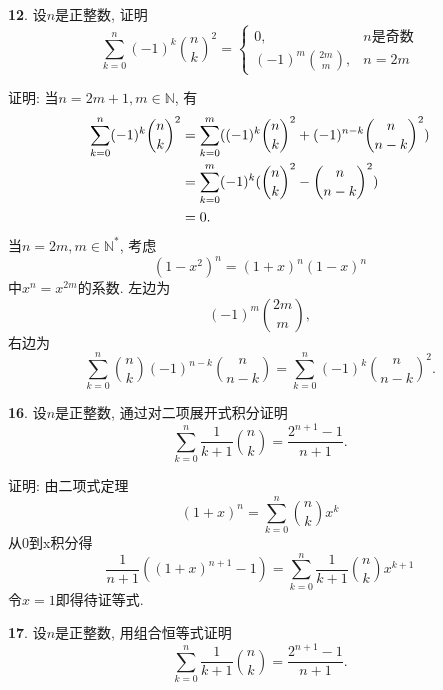 \documentclass[12pt,a4paper]{article}
\begin{document}
\begin{CJK*}{GBK}{song}
\par \textbf{12}. 设$n$是正整数, 证明
\begin{displaymath}
\sum^{n}_{k=0}(-1)^{k}\binom{n}{k}^2=
\begin{cases}
0,& n\text{是奇数}\\
(-1)^m\binom{2m}{m}, & n=2m
\end{cases}
\end{displaymath}
\par 证明: 当$n=2m+1,m\in\mathbb{N}$, 有
\begin{align*}
\sum^{n}_{k=0}(-1)^{k}\binom{n}{k}^2
&=\sum^{m}_{k=0}((-1)^{k}\binom{n}{k}^2+(-1)^{n-k}\binom{n}{n-k}^2)\notag\\
&=\sum^{m}_{k=0}(-1)^{k}(\binom{n}{k}^2-\binom{n}{n-k}^2)\notag\\
&=0. \notag
\end{align*}
当$n=2m,m\in\mathbb{N}^*$, 考虑
\begin{displaymath}
(1-x^2)^n=(1+x)^n(1-x)^n
\end{displaymath}
中$x^n=x^{2m}$的系数. 左边为
\begin{displaymath}
(-1)^m\binom{2m}{m},
\end{displaymath}
右边为
\begin{displaymath}
\sum_{k=0}^n\binom{n}{k}(-1)^{n-k}\binom{n}{n-k}=
\sum_{k=0}^n(-1)^{k}\binom{n}{n-k}^2.
\end{displaymath}

\par \textbf{16}. 设$n$是正整数, 通过对二项展开式积分证明
\begin{displaymath}
\sum_{k=0}^n \frac{1}{k+1}\binom{n}{k}=\frac{2^{n+1}-1}{n+1}.
\end{displaymath}
\par 证明: 由二项式定理
\begin{displaymath}
(1+x)^n=\sum_{k=0}^n\binom{n}{k}x^k
\end{displaymath}
从0到x积分得
\begin{displaymath}
\frac{1}{n+1}((1+x)^{n+1}-1)
=\sum_{k=0}^n\frac{1}{k+1}\binom{n}{k}x^{k+1}
\end{displaymath}
令$x=1$即得待证等式.

\par \textbf{17}. 设$n$是正整数, 用组合恒等式证明
\begin{displaymath}
\sum_{k=0}^n \frac{1}{k+1}\binom{n}{k}=\frac{2^{n+1}-1}{n+1}.
\end{displaymath}


\end{CJK*}
\end{document}
